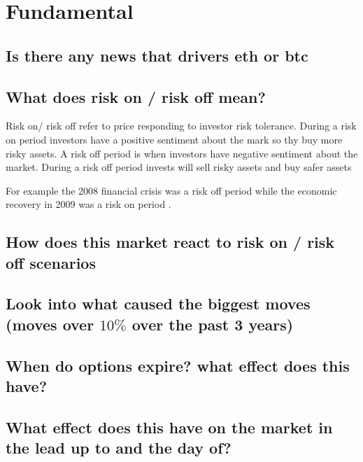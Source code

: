 \chapter{Fundamental}
\label{fun}

\section{ Is there any news that drivers eth or btc}
\section{ What does risk on / risk off mean?}
Risk on/ risk off refer to price responding to investor risk tolerance. During a risk on period investors have a positive sentiment about the mark so thy buy more risky assets. A risk off period is when investors have negative sentiment about the market.  During a risk off period invests will sell risky assets and buy safer assets

For example the 2008  financial crisis was a risk off period while the economic recovery in 2009 was a risk on period \cite{rri}.

\section{ How does this market react to risk on / risk off scenarios}


\section{ Look into what caused the biggest moves (moves over $10 \%$  over the past 3 years)}
\section{ When do options expire? what effect does this have?}
\section{ What effect does this have on the market in the lead up to and the day of?}